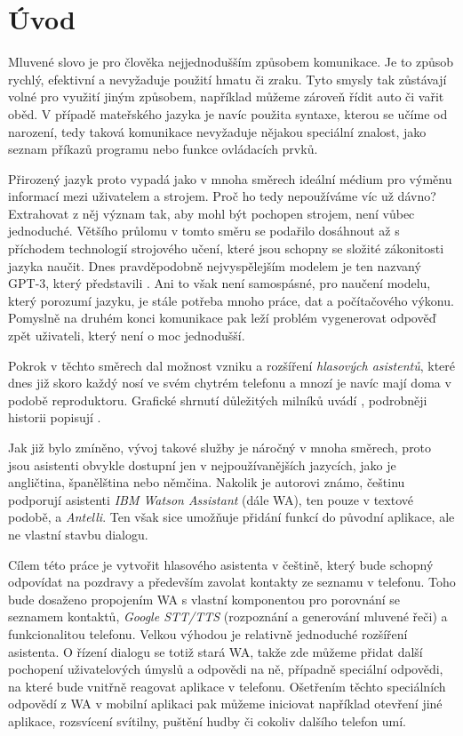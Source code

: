 \chapter*{Úvod}

Mluvené slovo je pro člověka nejjednodušším způsobem komunikace. Je to
způsob rychlý, efektivní a nevyžaduje použití hmatu či zraku. Tyto smysly
tak zůstávají volné pro využití jiným způsobem, například můžeme zároveň
řídit auto či vařit oběd. V případě mateřského jazyka je navíc použita
syntaxe, kterou se učíme od narození, tedy taková komunikace nevyžaduje
nějakou speciální znalost, jako seznam příkazů programu nebo funkce
ovládacích prvků.

Přirozený jazyk proto vypadá jako v mnoha směrech ideální médium pro výměnu
informací mezi uživatelem a strojem. Proč ho tedy nepoužíváme víc už dávno?
Extrahovat z něj význam tak, aby mohl být pochopen strojem, není vůbec
jednoduché. Většího průlomu v tomto směru se podařilo dosáhnout až s příchodem
technologií strojového učení, které jsou schopny se složité zákonitosti
jazyka  naučit. Dnes pravděpodobně nejvyspělejším modelem je
ten nazvaný GPT-3, který představili \citet{brown_language_2020}.
Ani to však není samospásné, pro naučení modelu,
který porozumí jazyku, je stále potřeba mnoho práce, dat a počítačového
výkonu. Pomyslně na druhém konci komunikace pak leží problém vygenerovat
odpověď zpět uživateli, který není o moc jednodušší.

Pokrok v těchto směrech dal možnost vzniku a rozšíření
\textit{hlasových asistentů}, které dnes již skoro každý nosí ve svém
chytrém telefonu a mnozí je navíc mají doma v podobě 
reproduktoru. Grafické shrnutí důležitých milníků uvádí \citet{voicebotai_2021},
podrobněji historii popisují \citet[strany 523-524]{jurafsky_slp_2020}.

Jak již bylo zmíněno, vývoj takové služby je náročný v mnoha
směrech, proto jsou asistenti obvykle dostupní jen v nejpoužívanějších
jazycích, jako je angličtina, španělština nebo němčina. Nakolik je autorovi
známo, češtinu podporují asistenti \textit{IBM Watson Assistant}
(dále WA), ten pouze v textové podobě, a \textit{Antelli}. Ten však sice
umožňuje přidání funkcí do původní aplikace, ale ne vlastní stavbu dialogu.

Cílem této práce je vytvořit hlasového asistenta v češtině, který bude schopný
odpovídat na pozdravy a především zavolat kontakty ze seznamu v telefonu.
Toho bude dosaženo propojením WA s vlastní komponentou
pro porovnání se seznamem kontaktů, \textit{Google STT/TTS}
(rozpoznání a generování mluvené řeči) a funkcionalitou telefonu. Velkou výhodou
je relativně jednoduché rozšíření asistenta. O řízení dialogu se totiž stará WA,
takže zde můžeme přidat další pochopení uživatelových úmyslů a odpovědi na ně,
případně speciální odpovědi, na které bude vnitřně reagovat aplikace v telefonu.
Ošetřením těchto speciálních odpovědí z WA v mobilní aplikaci pak můžeme
iniciovat například otevření jiné aplikace, rozsvícení svítilny, puštění
hudby či cokoliv dalšího telefon umí.

